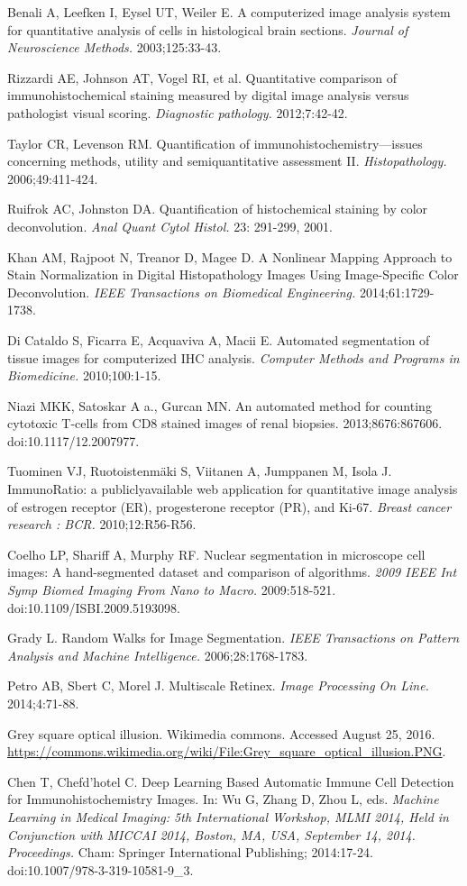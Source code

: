 \documentclass[12pt]{article}
\begin{document}
\noindent[22] Benali A, Leefken I, Eysel UT, Weiler E. A computerized image analysis system for quantitative analysis of cells in histological brain sections. \textit{Journal of Neuroscience Methods.} 2003;125:33-43.

\noindent[23] Rizzardi AE, Johnson AT, Vogel RI, et al. Quantitative comparison of immunohistochemical staining measured by digital image analysis versus pathologist visual scoring. \textit{Diagnostic pathology.} 2012;7:42-42.

\noindent[24] Taylor CR, Levenson RM. Quantification of immunohistochemistry---issues concerning methods, utility and semiquantitative assessment II. \textit{Histopathology.} 2006;49:411-424.

\noindent[25] Ruifrok AC, Johnston DA. Quantification of histochemical staining by color deconvolution. \textit{Anal Quant Cytol Histol.} 23: 291-299, 2001.

\noindent[26] Khan AM, Rajpoot N, Treanor D, Magee D. A Nonlinear Mapping Approach to Stain Normalization in Digital Histopathology Images Using Image-Specific Color Deconvolution. \textit{IEEE Transactions on Biomedical Engineering.} 2014;61:1729-1738.

\noindent[27] Di Cataldo S, Ficarra E, Acquaviva A, Macii E. Automated segmentation of tissue images for computerized IHC analysis. \textit{Computer Methods and Programs in Biomedicine.} 2010;100:1-15.

\noindent[28] Niazi MKK, Satoskar A a., Gurcan MN. An automated method for counting cytotoxic T-cells from CD8 stained images of renal biopsies. 2013;8676:867606. doi:10.1117/12.2007977.

\noindent[29] Tuominen VJ, Ruotoistenmäki S, Viitanen A, Jumppanen M, Isola J. ImmunoRatio: a publiclyavailable web application for quantitative image analysis of estrogen receptor (ER), progesterone receptor (PR), and Ki-67. \textit{Breast cancer research : BCR.} 2010;12:R56-R56.

\noindent[30] Coelho LP, Shariff A, Murphy RF. Nuclear segmentation in microscope cell images: A hand-segmented dataset and comparison of algorithms. \textit{2009 IEEE Int Symp Biomed Imaging From Nano to Macro.} 2009:518-521. doi:10.1109/ISBI.2009.5193098.

\noindent[31] Grady L. Random Walks for Image Segmentation. \textit{IEEE Transactions on Pattern Analysis and Machine Intelligence.} 2006;28:1768-1783.

\noindent[32] Petro AB, Sbert C, Morel J. Multiscale Retinex. \textit{Image Processing On Line.} 2014;4:71-88.

\noindent[33] Grey square optical illusion. Wikimedia commons. Accessed August 25, 2016. \url{https://commons.wikimedia.org/wiki/File:Grey_square_optical_illusion.PNG}. 

\noindent[34] Chen T, Chefd'hotel C. Deep Learning Based Automatic Immune Cell Detection for Immunohistochemistry Images. In: Wu G, Zhang D, Zhou L, eds. \textit{Machine Learning in Medical Imaging: 5th International Workshop, MLMI 2014, Held in Conjunction with MICCAI 2014, Boston, MA, USA, September 14, 2014. Proceedings.} Cham: Springer International Publishing; 2014:17-24. doi:10.1007/978-3-319-10581-9\_3.
\end{document}
